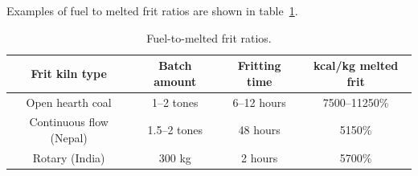 Examples of fuel to melted frit ratios are shown in table~\ref{tab:fritratios}.
\begin{landscape}
    \begin{table}\centering
\begin{center}
        \renewcommand{\arraystretch}{1.5}
    \begin{tabular}{|c|c|c|c|}\hline
      \textbf{Frit kiln type}&\textbf{Batch amount}&
      \textbf{Fritting time}&\textbf{kcal/kg melted frit}\\\hline\hline
      Open hearth coal&1--2 tones&6--12 hours&7500--11250\%\\\hline
      Continuous flow (Nepal)&1.5--2 tones&48 hours&5150\%\\\hline
      Rotary (India)&300 kg&2 hours&5700\%\\\hline
    \end{tabular}
    \caption{Fuel-to-melted frit ratios.}
    \label{tab:fritratios}
\end{center}
 \end{table}
\end{landscape}
